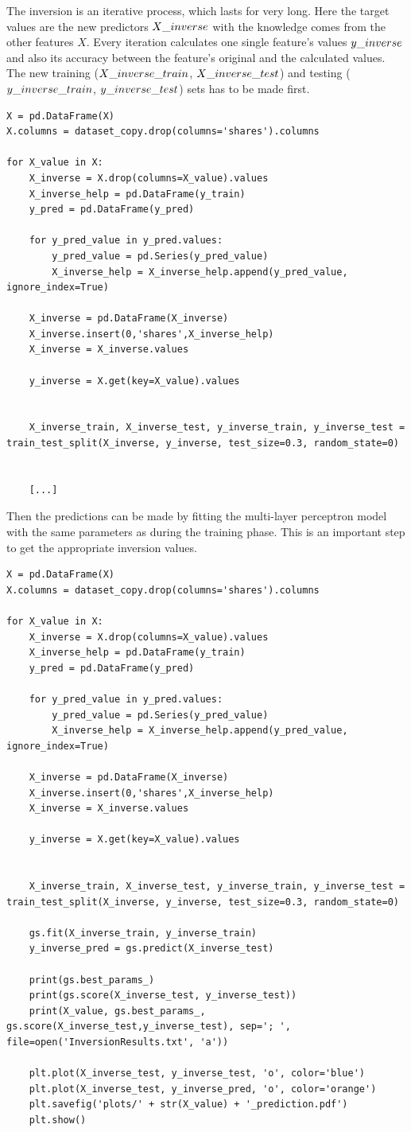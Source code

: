 The inversion is an iterative process, which lasts for very long. Here the target values are the new predictors $X\char`_inverse$ with the knowledge comes from the other features $X$. Every iteration calculates one single feature's values $y\char`_inverse$ and also its accuracy between the feature's original and the calculated values. \\
The new training ($X\char`_inverse\char`_train$, $X\char`_inverse\char`_test$) and testing ($y\char`_inverse\char`_train$, $y\char`_inverse\char`_test$) sets has to be made first.
\begin{lstlisting}
X = pd.DataFrame(X)
X.columns = dataset_copy.drop(columns='shares').columns

for X_value in X:
	X_inverse = X.drop(columns=X_value).values
	X_inverse_help = pd.DataFrame(y_train)
	y_pred = pd.DataFrame(y_pred)

	for y_pred_value in y_pred.values:
		y_pred_value = pd.Series(y_pred_value)
		X_inverse_help = X_inverse_help.append(y_pred_value, ignore_index=True)
		
	X_inverse = pd.DataFrame(X_inverse)
	X_inverse.insert(0,'shares',X_inverse_help)
	X_inverse = X_inverse.values

	y_inverse = X.get(key=X_value).values


	X_inverse_train, X_inverse_test, y_inverse_train, y_inverse_test = train_test_split(X_inverse, y_inverse, test_size=0.3, random_state=0)


	[...]
\end{lstlisting}
Then the predictions can be made by fitting the multi-layer perceptron model with the same parameters as during the training phase. This is an  important step to get the appropriate inversion values.
\begin{lstlisting}
X = pd.DataFrame(X)
X.columns = dataset_copy.drop(columns='shares').columns

for X_value in X:
	X_inverse = X.drop(columns=X_value).values
	X_inverse_help = pd.DataFrame(y_train)
	y_pred = pd.DataFrame(y_pred)

	for y_pred_value in y_pred.values:
		y_pred_value = pd.Series(y_pred_value)
		X_inverse_help = X_inverse_help.append(y_pred_value, ignore_index=True)

	X_inverse = pd.DataFrame(X_inverse)
	X_inverse.insert(0,'shares',X_inverse_help)
	X_inverse = X_inverse.values

	y_inverse = X.get(key=X_value).values


	X_inverse_train, X_inverse_test, y_inverse_train, y_inverse_test = train_test_split(X_inverse, y_inverse, test_size=0.3, random_state=0)

	gs.fit(X_inverse_train, y_inverse_train)
	y_inverse_pred = gs.predict(X_inverse_test)

	print(gs.best_params_)
	print(gs.score(X_inverse_test, y_inverse_test))
	print(X_value, gs.best_params_, gs.score(X_inverse_test,y_inverse_test), sep='; ', file=open('InversionResults.txt', 'a'))

	plt.plot(X_inverse_test, y_inverse_test, 'o', color='blue')
	plt.plot(X_inverse_test, y_inverse_pred, 'o', color='orange')
	plt.savefig('plots/' + str(X_value) + '_prediction.pdf')
	plt.show()
\end{lstlisting}

